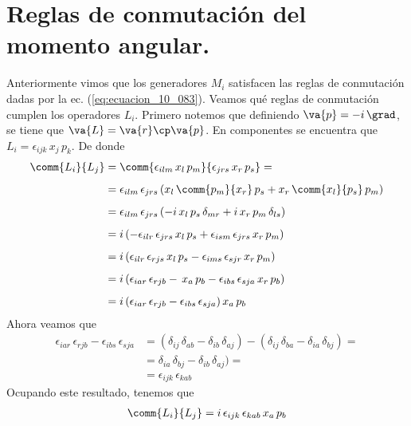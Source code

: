 \section{Reglas de conmutación del momento angular.}
Anteriormente vimos que los generadores $M_{i}$ satisfacen las reglas de conmutación dadas por la ec. (\ref{eq:ecuacion_10_083}). Veamos qué reglas de conmutación cumplen los operadores $L_{i}$. Primero notemos que definiendo $\va{p} = - i \, \grad$, se tiene que $\va{L} = \va{r} \cp \va{p}$. En componentes se encuentra que $L_{i} = \epsilon_{ijk} \, x_{j} \, p_{k}$. De donde
\begin{align}
\comm{L_{i}}{L_{j}} &= \comm{\epsilon_{ilm} \, x_{l} \, p_{m}}{\epsilon_{jrs} \, x_{r} \, p_{s}} = \nonumber \\[0.5em]
&= \epsilon_{ilm} \, \epsilon_{jrs} \, (x_{l} \, \comm{p_{m}}{x_{r}} \, p_{s} + x_{r} \, \comm{x_{l}}{p_{s}} \, p_{m}) \nonumber \\[0.5em]
&= \epsilon_{ilm} \, \epsilon_{jrs} \, (- i \, x_{l} \, p_{s} \, \delta_{mr} + i \, x_{r} \, p_{m} \, \delta_{ls}) \nonumber \\[0.5em]
&= i \, (- \epsilon_{ilr} \, \epsilon_{jrs} \, x_{l} \, p_{s} + \epsilon_{ism} \, \epsilon_{jrs} \, x_{r} \, p_{m}) \nonumber \\[0.5em]
&= i \, (\epsilon_{ilr} \, \epsilon_{rjs} \, x_{l} \, p_{s} - \epsilon_{ims} \, \epsilon_{sjr} \, x_{r} \, p_{m}) \nonumber \\[0.5em]
&= i \, (\epsilon_{iar} \, \epsilon_{rjb} - \, x_{a} \, p_{b} - \epsilon_{ibs} \, \epsilon_{sja} \, x_{r} \, p_{b}) \nonumber \\[0.5em]
&= i \, (\epsilon_{iar} \, \epsilon_{rjb} - \epsilon_{ibs} \, \epsilon_{sja}) \, x_{a} \, p_{b} \label{eq:ecuacion_10_103}
\end{align}
Ahora veamos que
\begin{align}
\epsilon_{iar} \, \epsilon_{rjb} - \epsilon_{ibs} \, \epsilon_{sja} &= (\delta_{ij} \, \delta_{ab} - \delta_{ib} \, \delta_{aj}) - (\delta_{ij} \, \delta_{ba} - \delta_{ia} \, \delta_{bj}) = \nonumber \\[0.5em]
&= \delta_{ia} \, \delta_{bj} - \delta_{ib} \, \delta_{aj}) = \nonumber \\[0.5em]
&= \epsilon_{ijk} \, \epsilon_{kab} \label{eq:ecuacion_10_104}
\end{align}
Ocupando este resultado, tenemos que
\begin{align*}
\comm{L_{i}}{L_{j}} = i \, \epsilon_{ijk} \, \epsilon_{kab} \, x_{a} \, p_{b}
\end{align*}
